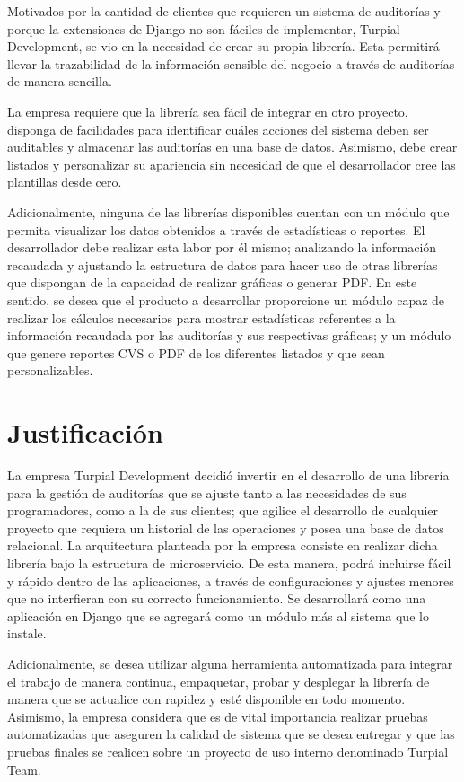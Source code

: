 Motivados por la cantidad de clientes que requieren un sistema de auditorías y
porque la extensiones de Django no son fáciles de implementar, Turpial
Development, se vio en la necesidad de crear su propia librería. Esta permitirá
llevar la trazabilidad de la información sensible del negocio a través de
auditorías de manera sencilla.

La empresa requiere que la librería sea fácil de integrar en otro proyecto,
disponga de facilidades para identificar cuáles acciones del sistema deben ser
auditables y almacenar las auditorías en una base de datos. Asimismo, debe
crear listados y personalizar su apariencia sin necesidad de que el
desarrollador cree las plantillas desde cero.

Adicionalmente, ninguna de las librerías disponibles cuentan con un módulo que
permita visualizar los datos obtenidos a través de estadísticas o reportes. El
desarrollador debe realizar esta labor por él mismo; analizando la información
recaudada y ajustando la estructura de datos para hacer uso de otras librerías
que dispongan de la capacidad de realizar gráficas o generar PDF. En este
sentido, se desea que el producto a desarrollar proporcione un módulo capaz de
realizar los cálculos necesarios para mostrar estadísticas referentes a la
información recaudada por las auditorías y sus respectivas gráficas; y un
módulo que genere reportes CVS o PDF de los diferentes listados y que sean
personalizables.

\section{Justificación}

La empresa Turpial Development decidió invertir en el desarrollo de una
librería para la gestión de auditorías que se ajuste tanto a las necesidades de
sus programadores, como a la de sus clientes; que agilice el desarrollo de
cualquier proyecto que requiera un historial de las operaciones y posea una
base de datos relacional. La arquitectura planteada por la empresa consiste en
realizar dicha librería bajo la estructura de microservicio. De esta manera,
podrá incluirse fácil y rápido dentro de las aplicaciones, a través de
configuraciones y ajustes menores que no interfieran con su correcto
funcionamiento. Se desarrollará como una aplicación en Django que se agregará
como un módulo más al sistema que lo instale.

Adicionalmente, se desea utilizar alguna herramienta automatizada para integrar
el trabajo de manera continua, empaquetar, probar y desplegar la librería de
manera que se actualice con rapidez y esté disponible en todo momento.
Asimismo, la empresa considera que es de vital importancia realizar pruebas
automatizadas que aseguren la calidad de sistema que se desea entregar y que
las pruebas finales se realicen sobre un proyecto de uso interno denominado
Turpial Team.

